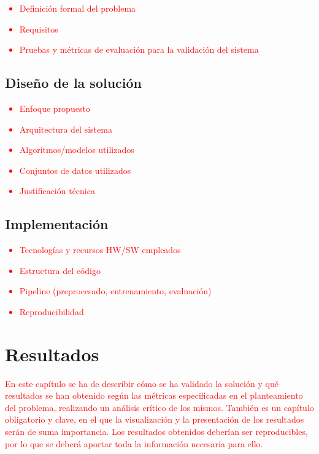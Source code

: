 \documentclass[12pt]{extarticle}
\numberwithin{equation}{section}
\begin{document}
\begin{refsection}
\textcolor{red}{
\begin{itemize}
    \item Definición formal del problema
    \item Requisitos
    \item Pruebas y métricas de evaluación para la validación del sistema
\end{itemize}
}

\subsection{Diseño de la soluci\'on}
\textcolor{red}{
\begin{itemize}
    \item Enfoque propuesto 
    \item Arquitectura del sistema 
    \item Algoritmos/modelos utilizados 
    \item Conjuntos de datos utilizados
    \item Justificación técnica 
\end{itemize}
}
\subsection{Implementaci\'on}
\textcolor{red}{
\begin{itemize}
    \item Tecnologías y recursos HW/SW empleados 
    \item Estructura del código 
    \item Pipeline (preprocesado, entrenamiento, evaluación) 
    \item Reproducibilidad
\end{itemize}
}


\newpage

\section{Resultados}\label{sec:results}

\textcolor{red}{En este capítulo se ha de describir cómo se ha validado la solución y qué resultados se han obtenido según las métricas especificadas en el planteamiento del problema, realizando un análisis crítico de los mismos. También es un capítulo obligatorio y clave, en el que la visualización y la presentación de los resultados serán de suma importancia.
Los resultados obtenidos deberían ser reproducibles, por lo que se deberá aportar toda la información necesaria para ello.
}


\end{refsection}
\end{document}
